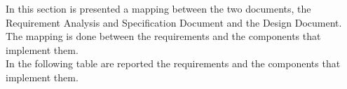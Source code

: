 In this section is presented a mapping between the two documents, the Requirement Analysis and Specification Document and the Design Document. The mapping is done between the requirements and the components that implement them.\\
In the following table are reported the requirements and the components that implement them.

